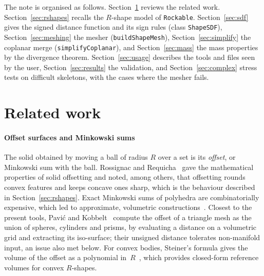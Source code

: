 \documentclass[11pt,a4paper]{article}
\newcommand{\Rmink}{R}                 %
\newcommand{\code}[1]{\texttt{#1}}
\begin{document}
The note is organised as follows. Section~\ref{sec:related} reviews the related
work. Section~\ref{sec:rshapes} recalls the $R$-shape model of \code{Rockable}.
Section~\ref{sec:sdf} gives the signed distance function and its sign rules
(class \code{ShapeSDF}), Section~\ref{sec:meshing} the mesher
(\code{buildShapeMesh}), Section~\ref{sec:simplify} the coplanar merge
(\code{simplifyCoplanar}), and Section~\ref{sec:mass} the mass properties by the
divergence theorem. Section~\ref{sec:usage} describes the tools and files seen by
the user, Section~\ref{sec:results} the validation, and Section~\ref{sec:complex}
stress tests on difficult skeletons, with the cases where the mesher fails.

\section{Related work}
\label{sec:related}

\paragraph{Offset surfaces and Minkowski sums}
The solid obtained by moving a ball of radius $\Rmink$ over a set is its
\emph{offset}, or Minkowski sum with the ball. Rossignac and
Requicha~\cite{rossignac1986} gave the mathematical properties of solid offsetting
and noted, among others, that offsetting rounds convex features and keeps concave
ones sharp, which is the behaviour described in Section~\ref{sec:rshapes}. Exact
Minkowski sums of polyhedra are combinatorially expensive, which led to
approximate, volumetric constructions~\cite{varadhan2006}. Closest to the present
tools, Pavi\'c and Kobbelt~\cite{pavic2008} compute the offset of a triangle mesh
as the union of spheres, cylinders and prisms, by evaluating a distance on a
volumetric grid and extracting its iso-surface; their unsigned distance tolerates
non-manifold input, an issue also met below. For convex bodies, Steiner's formula
gives the volume of the offset as a polynomial in~$\Rmink$~\cite{schneider2014},
which provides closed-form reference volumes for convex $R$-shapes.
\end{document}
